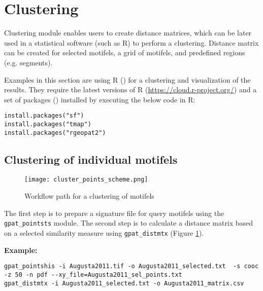 \FloatBarrier

\section{Clustering \label{clustering}}

Clustering module enables users to create distance matrices, which can be later used in a statistical software (such as R) to perform a clustering.
Distance matrix can be created for selected motifels, a grid of motifels, and predefined regions (e.g. segments).

Examples in this section are using R (\cite{R}) for a clustering and visualization of the results. 
They require the latest versions of R (\url{https://cloud.r-project.org/}) and a set of packages (\cite{rsf,rtmap,rrgeopat2}) installed by executing the below code in R:

\begin{minipage}{\linewidth}
\begin{lstlisting}
install.packages("sf")
install.packages("tmap")
install.packages("rgeopat2")
\end{lstlisting}
\end{minipage}

\subsection{Clustering of individual motifels}

\begin{figure}[H]
	\centering
	\texttt{[image: cluster\_points\_scheme.png]}
	\caption{Workflow path for a clustering of motifels}
	\label{FIG:CLUSTER_POINTS}
\end{figure}

The first step is to prepare a signature file for query motifels using the {\tt gpat\_pointsts} module. 
The second step is to calculate a distance matrix based on a selected similarity measure using {\tt gpat\_distmtx} (Figure \ref{FIG:CLUSTER_POINTS}).

{\bf Example:}

\begin{minipage}{\linewidth}
\begin{lstlisting}
gpat_pointshis -i Augusta2011.tif -o Augusta2011_selected.txt  -s cooc -z 50 -n pdf --xy_file=Augusta2011_sel_points.txt
gpat_distmtx -i Augusta2011_selected.txt -o Augusta2011_matrix.csv
\end{lstlisting}
\end{minipage}

